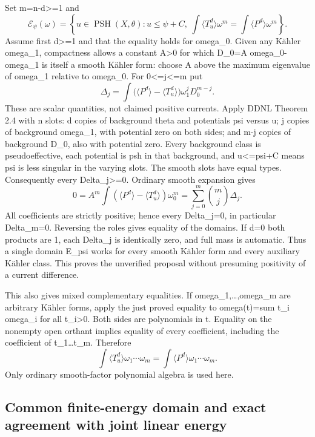 \documentclass[
]{article}
\begin{document}
Set m=n-d\textgreater=1 and \[
\mathcal{E}_\psi(\omega)=\left\{u\in\operatorname{PSH}(X,\theta):u\leq\psi+C,
\ \int\langle T_u^d\rangle\omega^m=\int\langle P^d\rangle\omega^m\right\}.
\] Assume first d\textgreater=1 and that the equality holds for
omega\_0. Given any Kähler omega\_1, compactness allows a constant
A\textgreater0 for which D\_0=A omega\_0-omega\_1 is itself a smooth
Kähler form: choose A above the maximum eigenvalue of omega\_1 relative
to omega\_0. For 0\textless=j\textless=m put \[
\Delta_j=\int\big(\langle P^d\rangle-\langle T_u^d\rangle\big)
\omega_1^j D_0^{m-j}.
\] These are scalar quantities, not claimed positive currents. Apply
DDNL Theorem 2.4 with n slots: d copies of background theta and
potentials psi versus u; j copies of background omega\_1, with potential
zero on both sides; and m-j copies of background D\_0, also with
potential zero. Every background class is pseudoeffective, each
potential is psh in that background, and u\textless=psi+C means psi is
less singular in the varying slots. The smooth slots have equal types.
Consequently every Delta\_j\textgreater=0. Ordinary smooth expansion
gives \[
0=A^m\int(\langle P^d\rangle-\langle T_u^d\rangle)\omega_0^m
=\sum_{j=0}^m\binom mj\Delta_j.
\] All coefficients are strictly positive; hence every Delta\_j=0, in
particular Delta\_m=0. Reversing the roles gives equality of the
domains. If d=0 both products are 1, each Delta\_j is identically zero,
and full mass is automatic. Thus a single domain E\_psi works for every
smooth Kähler form and every auxiliary Kähler class. This proves the
unverified proposal without presuming positivity of a current
difference.

This also gives mixed complementary equalities. If
omega\_1,\ldots,omega\_m are arbitrary Kähler forms, apply the just
proved equality to omega(t)=sum t\_i omega\_i for all t\_i\textgreater0.
Both sides are polynomials in t. Equality on the nonempty open orthant
implies equality of every coefficient, including the coefficient of
t\_1\ldots t\_m. Therefore \[
\int\langle T_u^d\rangle\omega_1\cdots\omega_m
=\int\langle P^d\rangle\omega_1\cdots\omega_m.\tag{5}
\] Only ordinary smooth-factor polynomial algebra is used here.

\subsection{Common finite-energy domain and exact agreement with joint
linear
energy}\label{common-finite-energy-domain-and-exact-agreement-with-joint-linear-energy}
\end{document}
